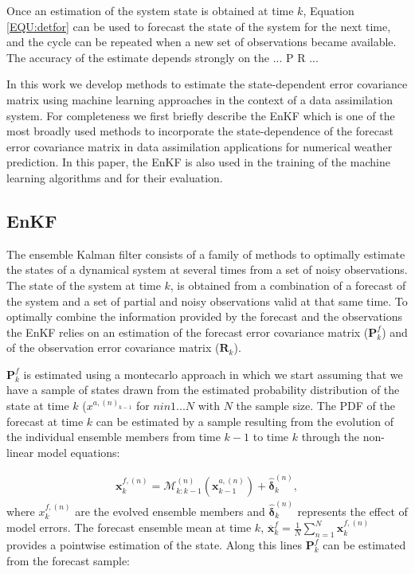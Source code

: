 \documentclass[num-refs]{wiley-article}
\renewcommand{\v}[1]{\ensuremath{\mathbf{#1}}}
\newcommand{\gv}[1]{\bm{#1}}
\begin{document}
Once an estimation of the system state is obtained at time $k$, Equation \ref{EQU:detfor} can be used to forecast the state of the system for the next time, and the cycle can be repeated when a new set of observations became available. The accuracy of the estimate depends strongly on the ... P R ... 

In this work we develop methods to estimate the state-dependent error covariance matrix using machine learning approaches in the context of a data assimilation system. For completeness we first briefly describe the EnKF which is one of the most broadly used methods to incorporate the state-dependence of the forecast error covariance matrix in data assimilation applications for numerical weather prediction. In this paper, the EnKF is also used in the training of the machine learning algorithms and for their evaluation.

\subsection{EnKF}

The ensemble Kalman filter consists of a family of methods to optimally estimate the states of a dynamical system at several times from a set of noisy observations. The state of the system at time $k$, is obtained from a combination of a forecast of the system and a set of partial and noisy observations valid at that same time. To optimally combine the information provided by the forecast and the observations the EnKF relies on an estimation of the forecast error covariance matrix ($\gv P^{f}_{k}$) and of the observation error covariance matrix ($\gv R_k$).

$\gv P^{f}_{k}$ is estimated using a montecarlo approach in which we start assuming that we have a sample of states drawn from the estimated probability distribution of the state at time $k$ ($x^{a,(n)_{k-1}}$ for $n in 1 ... N$ with $N$ the sample size. The PDF of the forecast at time $k$ can be estimated by a sample resulting from the evolution of the individual ensemble members from time $k-1$ to time $k$ through the non-linear model equations:

\begin{align}
  \label{EQU:MODEL1}
  \v x^{f,(n)}_{k} =  \mathcal{M}^{(n)}_{k:k-1}(\v x^{a,(n)}_{k-1}) + \hat{\gv\delta}^{(n)}_{k},
\end{align}
where $x^{f,(n)}_{k}$ are the evolved ensemble members and $\hat{\gv\delta}^{(n)}_{k}$ represents the effect of model errors. 
The forecast ensemble mean at time $k$, $\overline{\v x}^{f}_{k} = \frac{1}{N} \sum_{n=1}^{N} \v x^{f,(n)}_{k}$ provides a pointwise estimation of the state. 
Along this lines $\gv P^{f}_{k}$ can be estimated from the forecast sample:
\end{document}
